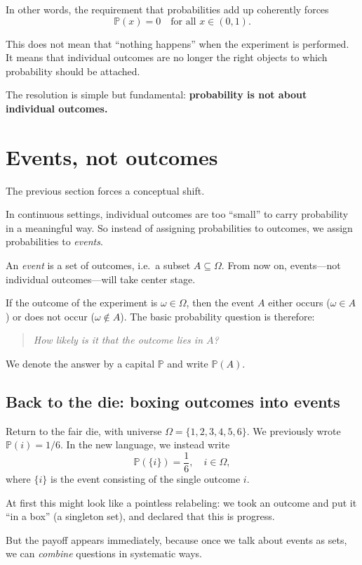 \documentclass[11pt]{article}
\theoremstyle{remark}
\begin{document}
In other words, the requirement that probabilities add up coherently forces
\[
\mathbb{P}(x) = 0 \quad \text{for all } x \in (0,1).
\]

This does not mean that “nothing happens” when the experiment is performed.
It means that individual outcomes are no longer the right objects to which
probability should be attached.

The resolution is simple but fundamental:
\textbf{probability is not about individual outcomes.}


\section{Events, not outcomes}

The previous section forces a conceptual shift.

In continuous settings, individual outcomes are too “small” to carry probability in a meaningful way.
So instead of assigning probabilities to outcomes, we assign probabilities to \emph{events}.

\medskip

An \emph{event} is a set of outcomes, i.e.\ a subset \(A \subseteq \Omega\).
From now on, events---not individual outcomes---will take center stage.

If the outcome of the experiment is \(\omega \in \Omega\), then the event \(A\) either occurs
(\(\omega \in A\)) or does not occur (\(\omega \notin A\)).
The basic probability question is therefore:
\begin{quote}
\emph{How likely is it that the outcome lies in \(A\)?}
\end{quote}
We denote the answer by a capital \(\mathbb{P}\) and write \(\mathbb{P}(A)\).

\subsection{Back to the die: boxing outcomes into events}

Return to the fair die, with universe \(\Omega=\{1,2,3,4,5,6\}\).
We previously wrote \(\mathbb{P}(i)=1/6\).
In the new language, we instead write
\[
\mathbb{P}(\{i\})=\frac{1}{6}, \quad i\in\Omega,
\]
where \(\{i\}\) is the event consisting of the single outcome \(i\).

At first this might look like a pointless relabeling:
we took an outcome and put it “in a box” (a singleton set), and declared that this
is progress.

But the payoff appears immediately, because once we talk about events as sets, we can
\emph{combine} questions in systematic ways.
\end{document}
